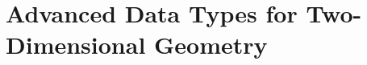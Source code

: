 \chapter{Advanced Data Types for Two-Dimensional Geometry}
\label{Advanced Data Types for Two-Dimensional Geometry}



\newpage

\newpage

\newpage

\newpage

%
%
%

